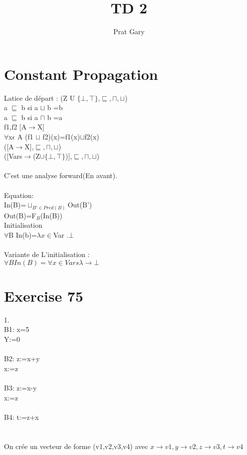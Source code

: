 \documentclass[10pt,a4paper]{article}
\author{Prat Gary}
\title{TD 2}
\begin{document}
\maketitle
\section{Constant Propagation}

Latice de départ : (Z U $\lbrace\bot,\top\rbrace$,$\sqsubseteq,\sqcap,\sqcup$)\\
a $\sqsubseteq$  b si a $\sqcup$ b =b \\
a $\sqsubseteq$  b si a $\sqcap$ b =a \\
f1,f2 [A$\rightarrow$X]\\
$\forall$x$\epsilon$ A 		
(f1 $\sqcup$ f2)(x)=f1(x)$\sqcup$f2(x)\\
([A$\rightarrow$X],$\sqsubseteq,\sqcap,\sqcup$)\\
([Vars$\rightarrow$(Z$\cup\lbrace\bot,\top\rbrace$)],$\sqsubseteq,\sqcap,\sqcup$)\\
\\
C'est une analyse forward(En avant).\\\\
Equation:\\
In(B)=$\sqcup_{B'\in Pred(B)}$Out(B')\\
Out(B)=F$_{B}$(In(B))\\
Initialisation\\
$\forall$B In(b)=$\lambda x \in$Var .$\bot$\\\\
Variante de L'initialisation :\\
$\forall B In(B)=\forall x \in Vars \lambda \rightarrow \bot$
\section{Exercise 75}
{\large 1.}\\
B1: x=5\\Y:=0\\
\\
B2: z:=x+y\\
x:=z\\
\\
B3: z:=x-y\\
x:=z\\
\\
B4: t:=z+x\\
\\
\\
On crée un vecteur de forme (v1,v2,v3,v4) avec $x \rightarrow v1,y \rightarrow v2,z \rightarrow v3, t \rightarrow v4$\\
\end{document}
